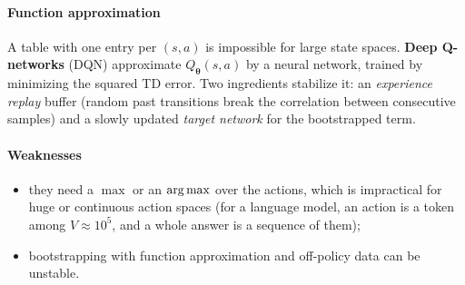 \paragraph{Function approximation} A table with one entry per $(s,a)$ is impossible for
large state spaces. \textbf{Deep Q-networks} (DQN) approximate $Q_{\bm{\theta}}(s,a)$ by a
neural network, trained by minimizing the squared TD error. Two ingredients stabilize it:
an \emph{experience replay} buffer (random past transitions break the correlation between
consecutive samples) and a slowly updated \emph{target network} for the bootstrapped term.

\paragraph{Weaknesses}
\begin{itemize}
    \item they need a $\max$ or an $\operatorname*{arg\,max}$ over the actions, which is impractical for huge
        or continuous action spaces (for a language model, an action is a token among
        $V\approx10^{5}$, and a whole answer is a sequence of them);
    \item bootstrapping with function approximation and off-policy data can be unstable.
\end{itemize}
